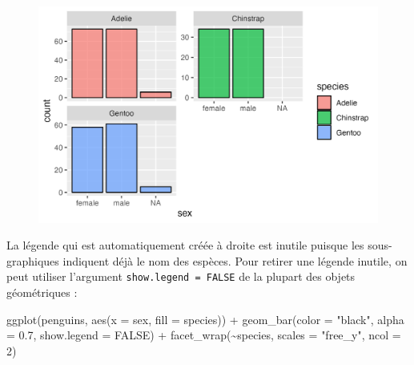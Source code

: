 \documentclass[
  letterpaper,
  DIV=11,
  numbers=noendperiod]{scrreprt}
\newenvironment{Shaded}{\begin{snugshade}}{\end{snugshade}}
\newcommand{\AttributeTok}[1]{\textcolor[rgb]{0.40,0.45,0.13}{#1}}
\newcommand{\ConstantTok}[1]{\textcolor[rgb]{0.56,0.35,0.01}{#1}}
\newcommand{\DecValTok}[1]{\textcolor[rgb]{0.68,0.00,0.00}{#1}}
\newcommand{\FloatTok}[1]{\textcolor[rgb]{0.68,0.00,0.00}{#1}}
\newcommand{\FunctionTok}[1]{\textcolor[rgb]{0.28,0.35,0.67}{#1}}
\newcommand{\NormalTok}[1]{\textcolor[rgb]{0.00,0.23,0.31}{#1}}
\newcommand{\SpecialCharTok}[1]{\textcolor[rgb]{0.37,0.37,0.37}{#1}}
\newcommand{\StringTok}[1]{\textcolor[rgb]{0.13,0.47,0.30}{#1}}
\begin{document}
\begin{figure}[H]

{\centering \includegraphics{./03-visualization_files/figure-pdf/unnamed-chunk-63-1.png}

}

\end{figure}

La légende qui est automatiquement créée à droite est inutile puisque
les sous-graphiques indiquent déjà le nom des espèces. Pour retirer une
légende inutile, on peut utiliser l'argument
\texttt{show.legend\ =\ FALSE} de la plupart des objets géométriques :

\begin{Shaded}
\begin{Highlighting}[]
\FunctionTok{ggplot}\NormalTok{(penguins, }\FunctionTok{aes}\NormalTok{(}\AttributeTok{x =}\NormalTok{ sex, }\AttributeTok{fill =}\NormalTok{ species)) }\SpecialCharTok{+}
  \FunctionTok{geom\_bar}\NormalTok{(}\AttributeTok{color =} \StringTok{"black"}\NormalTok{, }\AttributeTok{alpha =} \FloatTok{0.7}\NormalTok{, }\AttributeTok{show.legend =} \ConstantTok{FALSE}\NormalTok{) }\SpecialCharTok{+}
  \FunctionTok{facet\_wrap}\NormalTok{(}\SpecialCharTok{\textasciitilde{}}\NormalTok{species, }\AttributeTok{scales =} \StringTok{"free\_y"}\NormalTok{, }\AttributeTok{ncol =} \DecValTok{2}\NormalTok{)}
\end{Highlighting}
\end{Shaded}
\end{document}
